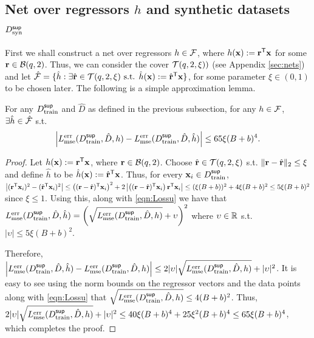 \subsection{Net over regressors $h$ and synthetic datasets $D^{\sf sup}_{\textnormal{syn}}$}\label{sec:net}
First we shall construct a net over regressors $h \in \mathcal{F}$, where $h({\mathbf{x}}) := {\mathbf{r}}^{\sf T}{\mathbf{x}}$ for some ${\mathbf{r}} \in \mathcal{B}(q,2)$. Thus, we can consider the cover $\mathcal{T}(q, 2, \xi))$ (see Appendix \ref{sec:nets}) and let $\hat{\mathcal{F}} = \{\hat{h} : \exists \hat{{\mathbf{r}}} \in \mathcal{T}(q, 2, \xi)\textnormal{ s.t. } \hat{h}({\mathbf{x}}) := \hat{{\mathbf{r}}}^{\sf T}{\mathbf{x}}\}$, for some parameter $\xi \in (0,1)$ to be chosen later. The following is a simple approximation lemma.
\begin{lemma} \label{lem:vecnet}
    For any $D^{\sf sup}_{\textnormal{train}}$ and $\hat{D}$ as defined in the previous subsection, for any $h \in \mathcal{F}$, $\exists \hat{h} \in \hat{\mathcal{F}}$ s.t. 
    \begin{equation}
        \left|L^{\textnormal{err}}_{\textnormal{mse}}(D^{\sf sup}_{\textnormal{train}}, \hat{D}, h) - L^{\textnormal{err}}_{\textnormal{mse}}(D^{\sf sup}_{\textnormal{train}}, \hat{D}, \hat{h}) \right| \leq  65\xi(B+b)^4.
    \end{equation}
\end{lemma}
\begin{proof}
    Let $h({\mathbf{x}}) := {\mathbf{r}}^{\sf T}{\mathbf{x}}$, where ${\mathbf{r}} \in \mathcal{B}(q,2)$. Choose $\hat{{\mathbf{r}}} \in \mathcal{T}(q, 2, \xi)$ s.t. $\|{\mathbf{r}} - \hat{{\mathbf{r}}}\|_2 \leq \xi$ and define $\hat{h}$ to be $\hat{h}({\mathbf{x}}) := \hat{{\mathbf{r}}}^{\sf T}{\mathbf{x}}$. Thus, for every ${\mathbf{x}}_i \in D^{\sf sup}_{\textnormal{train}}$, $\left|({\mathbf{r}}^{\sf T}{\mathbf{x}}_i)^2 - (\hat{{\mathbf{r}}}^{\sf T}{\mathbf{x}}_i)^2\right| \leq \left(({\mathbf{r}} - \hat{{\mathbf{r}}})^{\sf T}{\mathbf{x}}_i\right)^2 + 2 \left|\left(({\mathbf{r}} - \hat{{\mathbf{r}}})^{\sf T}{\mathbf{x}}_i\right){\mathbf{r}}^{\sf T}{\mathbf{x}}_i\right| \leq (\xi (B+b))^2 + 4\xi(B+b)^2 \leq 5\xi(B+b)^2$ since $\xi \leq 1$. Using this, along with \eqref{eqn:Lossu} we have that $L^{\textnormal{err}}_{\textnormal{mse}}(D^{\sf sup}_{\textnormal{train}}, \hat{D}, \hat{h}) = \left(\sqrt{L^{\textnormal{err}}_{\textnormal{mse}}(D^{\sf sup}_{\textnormal{train}}, \hat{D}, h)} + \upsilon\right)^2$ where $\upsilon \in \mathbb{R}$ s.t. $|\upsilon| \leq 5\xi(B+b)^2$. 
    
    Therefore, $\left|L^{\textnormal{err}}_{\textnormal{mse}}(D^{\sf sup}_{\textnormal{train}}, \hat{D}, \hat{h}) - L^{\textnormal{err}}_{\textnormal{mse}}(D^{\sf sup}_{\textnormal{train}}, \hat{D}, h)\right| \leq 2 |\upsilon|\sqrt{L^{\textnormal{err}}_{\textnormal{mse}}(D^{\sf sup}_{\textnormal{train}}, \hat{D}, h)} + |\upsilon|^2$. It is easy to see using the norm bounds on the regressor vectors and the data points along with \eqref{eqn:Lossu} that $\sqrt{L^{\textnormal{err}}_{\textnormal{mse}}(D^{\sf sup}_{\textnormal{train}}, \hat{D}, h)} \leq 4(B+b)^2$. Thus, $2|\upsilon|\sqrt{L^{\textnormal{err}}_{\textnormal{mse}}(D^{\sf sup}_{\textnormal{train}}, \hat{D}, h)} + |\upsilon|^2 \leq 40\xi(B+b)^4 + 25\xi^2(B+b)^4 \leq 65\xi(B+b)^4$, which completes the proof.
\end{proof}



